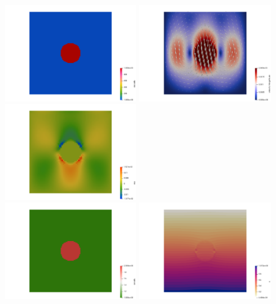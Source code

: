 \begin{center} 
\includegraphics[width=5.7cm]{python_codes/fieldstone_16/results/visc_field_1/eta}
\includegraphics[width=5.7cm]{python_codes/fieldstone_16/results/visc_field_1/vel}
\includegraphics[width=5.7cm]{python_codes/fieldstone_16/results/visc_field_1/exx}\\
\includegraphics[width=5.7cm]{python_codes/fieldstone_16/results/visc_field_1/rho}
\includegraphics[width=5.7cm]{python_codes/fieldstone_16/results/visc_field_1/q}

\end{center}

